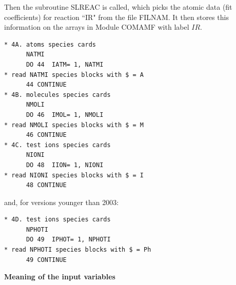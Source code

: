 \medskip

Then the subroutine SLREAC is called, which picks the atomic data (fit
coefficients) for reaction ``IR" from the file FILNAM.
It then stores this information on the arrays in Module COMAMF with label $IR$.

\begin{lstlisting}
* 4A. atoms species cards
      NATMI
      DO 44  IATM= 1, NATMI
* read NATMI species blocks with $ = A
      44 CONTINUE
* 4B. molecules species cards
      NMOLI
      DO 46  IMOL= 1, NMOLI
* read NMOLI species blocks with $ = M
      46 CONTINUE
* 4C. test ions species cards
      NIONI
      DO 48  IION= 1, NIONI
* read NIONI species blocks with $ = I
      48 CONTINUE
\end{lstlisting}

and, for versions younger than 2003:

\begin{lstlisting}
* 4D. test ions species cards
      NPHOTI
      DO 49  IPHOT= 1, NPHOTI
* read NPHOTI species blocks with $ = Ph
      49 CONTINUE
\end{lstlisting}

\medskip

\textbf{Meaning of the input variables}

\medskip

